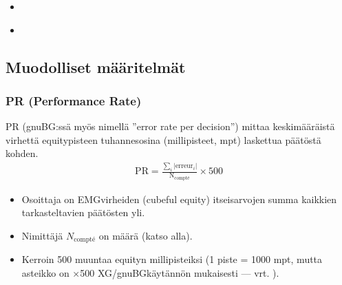 \documentclass[letterpaper,10pt,finnish]{sphinxmanual}
\begin{document}
\begin{sphinxcontents}
\begin{itemize}
\begin{itemize}
\item {} 
\sphinxAtStartPar
{}\label{\detokenize{stats_parity:id11}}{\hyperref[\detokenize{stats_parity:comparaison-gnubg-blunderdb-import-sgf-moteurs-differents}]{}}

\end{itemize}

\item {} 
\sphinxAtStartPar
{}\label{\detokenize{stats_parity:id12}}{\hyperref[\detokenize{stats_parity:valider-vos-propres-chiffres}]{}}

\item {} 
\sphinxAtStartPar
{}\label{\detokenize{stats_parity:id13}}{\hyperref[\detokenize{stats_parity:reference-gnubg}]{}}

\end{itemize}
\end{sphinxcontents}


\subsection{Muodolliset määritelmät}
\label{\detokenize{stats_parity:definitions-formelles}}

\subsubsection{PR (Performance Rate)}
\label{\detokenize{stats_parity:pr-performance-rate}}
\sphinxAtStartPar
PR (gnuBG:ssä myös nimellä ”error rate per decision”) mittaa keskimääräistä virhettä equity\sphinxhyphen{}pisteen tuhannesosina (millipisteet, mpt) laskettua päätöstä kohden.
\begin{equation*}
\begin{split}\mathrm{PR} = \frac{\sum_i |\mathrm{erreur}_i|}{\mathrm{N_{compté}}} \times 500\end{split}
\end{equation*}\begin{itemize}
\item {} 
\sphinxAtStartPar
Osoittaja on EMG\sphinxhyphen{}virheiden (cubeful equity) itseisarvojen summa kaikkien tarkasteltavien päätösten yli.

\item {} 
\sphinxAtStartPar
Nimittäjä \(N_\text{compté}\) on  määrä (katso alla).

\item {} 
\sphinxAtStartPar
Kerroin 500 muuntaa equityn millipisteiksi (1 piste = 1000 mpt, mutta asteikko on ×500 XG/gnuBG\sphinxhyphen{}käytännön mukaisesti — vrt. ).

\end{itemize}
\end{document}

